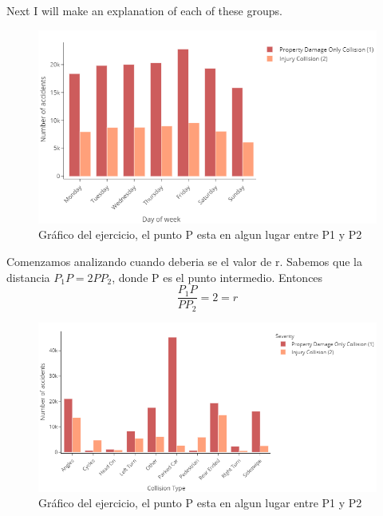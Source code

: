 \documentclass[12pt]{article}
\begin{document}
Next I will make an explanation of each of these groups.

\begin{figure}[htbp]
    \centering
      \includegraphics[width=1\textwidth]{../images/day_of_week.png}
    \caption{Gráfico del ejercicio, el punto P esta en algun lugar entre P1 y P2}
    \label{fig:ejemplo}
  \end{figure}
Comenzamos analizando cuando deberia se el valor de r. Sabemos que la distancia $P_{1}P=2PP_{2}$, donde P es el punto intermedio.
Entonces
\begin{equation}
  \frac{P_{1}P}{PP_{2}}=2=r
  \label{r}
  \end{equation}

  \begin{figure}[htbp]
    \centering
      \includegraphics[width=1\textwidth]{../images/collition_type.png}
    \caption{Gráfico del ejercicio, el punto P esta en algun lugar entre P1 y P2}
    \label{fig:ejemplo}
  \end{figure}
\end{document}
